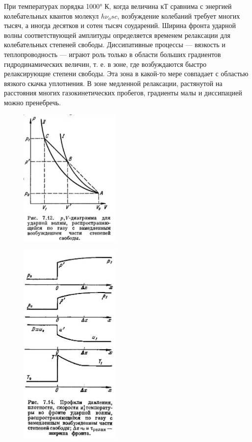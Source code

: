 \documentclass[10pt, a4paper]{article}
\numberwithin{equation}{section}
\begin{document}
При температурах порядка 1000° К, когда величина кТ сравнима с энергией колебательных квантов молекул $h\nu_osc$, возбуждение колебаний требует многих тысяч, а иногда десятков и сотен тысяч соударений. Ширина фронта ударной волны соответствующей амплитуды определяется временем релаксации для колебательных степеней свободы. 
Диссипативные процессы — вязкость и теплопроводность — играют роль только в области больших градиентов гидродинамических величин, т. е. в зоне, где возбуждаются быстро релаксирующие степени свободы. Эта зона в какой-то мере совпадает с областью вязкого скачка уплотнения. В зоне медленной релаксации, растянутой на расстояния многих газокинетических пробегов, градиенты малы и диссипацией можно пренебречь.
\begin{figure}[h]
	\centering
	{\includegraphics[width=50mm]{13. 2 udern adiab.JPG}}
	
	{\includegraphics[width=50mm]{13.rel sloy.JPG}}
	
\end{figure}
\end{document}
